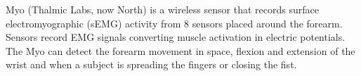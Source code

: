 \documentclass{article}
\begin{document}
Myo (Thalmic Labs, now North) \cite{northwebsite} is a wireless sensor that records surface electromyographic (sEMG) activity from 8 sensors placed around the forearm. Sensors record EMG signals converting muscle activation in electric potentials. The Myo can detect the forearm movement in space, flexion and extension of the wrist and when a subject is spreading the fingers or closing the fist. %
\end{document}

